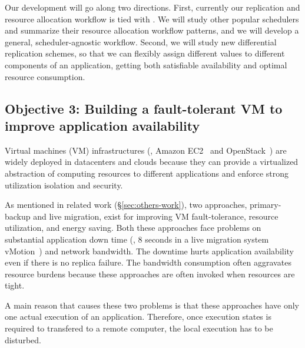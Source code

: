 
 Our \tripod development will go along two directions. 
First, currently our replication and resource allocation workflow is tied with 
\mesos. We will study other popular schedulers and summarize their 
resource allocation workflow patterns, and we will develop a general, 
scheduler-agnostic workflow. Second, we will study new differential replication 
schemes, so that we can flexibly assign different  values to different 
components of an application, getting both satisfiable availability and optimal 
resource consumption.

\vspace{-.15in}\subsection{Objective 3: Building a fault-tolerant VM to improve 
application availability}\label{sec:vm}\vspace{-.075in}




Virtual machines (VM) infrastructures (\eg, Amazon EC2~\cite{amazon:vpc} and 
OpenStack~\cite{openstack}) are widely deployed in datacenters and clouds 
because they can provide a virtualized abstraction of computing resources to 
different applications and enforce strong utilization isolation and security. 

As mentioned in related work (\S\ref{sec:others-work}), two approaches, 
primary-backup and live migration, exist for improving VM fault-tolerance, 
resource utilization, and energy saving. Both these approaches face problems on 
substantial application down time (\eg, 8 seconds in a live migration system 
vMotion~\cite{vmotion:atc05}) and network bandwidth. The downtime hurts 
application availability even if there is no replica failure. The bandwidth 
consumption often aggravates resource burdens because these approaches are often 
invoked when resources are tight.

A main reason that causes these two problems is that these approaches have only 
one actual execution of an application. Therefore, once execution states is 
required to transfered to a remote computer, the local execution has to be 
disturbed.



